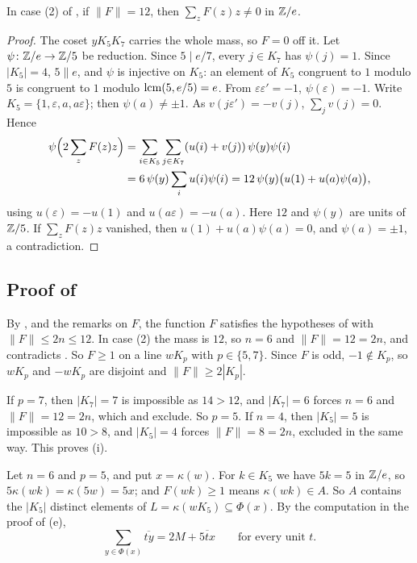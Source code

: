 \begin{lemma}\label{lem:killhalf}
In case \textup{(2)} of , if $\|F\|=12$, then
$\sum_{z}F(z)z\ne0$ in $\mathbb{Z}/e$.
\end{lemma}

\begin{proof}
The coset $yK_{5}K_{7}$ carries the whole mass, so $F=0$ off it. Let
$\psi\colon\mathbb{Z}/e\to\mathbb{Z}/5$ be reduction. Since $5\mid e/7$, every $j\in K_{7}$
has $\psi(j)=1$. Since $|K_{5}|=4$, $5\parallel e$, and $\psi$ is injective
on $K_{5}$: an element of $K_{5}$ congruent to $1$ modulo $5$ is congruent to
$1$ modulo $\operatorname{lcm}(5,e/5)=e$. From $\varepsilon\varepsilon'=-1$,
$\psi(\varepsilon)=-1$. Write $K_{5}=\{1,\varepsilon,a,a\varepsilon\}$; then
$\psi(a)\ne\pm1$. As $v(j\varepsilon')=-v(j)$, $\sum_{j}v(j)=0$. Hence
\begin{align*}
  \psi\Bigl(2\sum_{z}F(z)z\Bigr)&=\sum_{i\in K_{5}}\sum_{j\in K_{7}}
  (u(i)+v(j))\,\psi(y)\psi(i)\\
  &=6\,\psi(y)\sum_{i}u(i)\psi(i)=12\,\psi(y)\bigl(u(1)+u(a)\psi(a)\bigr),
\end{align*}
using $u(\varepsilon)=-u(1)$ and $u(a\varepsilon)=-u(a)$. Here $12$ and
$\psi(y)$ are units of $\mathbb{Z}/5$. If $\sum_{z}F(z)z$ vanished, then
$u(1)+u(a)\psi(a)=0$, and $\psi(a)=\pm1$, a contradiction.
\end{proof}

\subsection{Proof of \texorpdfstring{}{the theorem}}
By ,  and the remarks on $F$, the function
$F$ satisfies the hypotheses of  with $\|F\|\le2n\le12$. In
case (2) the mass is $12$, so $n=6$ and $\|F\|=12=2n$, and 
contradicts . So $F\ge1$ on a line $wK_{p}$ with
$p\in\{5,7\}$. Since $F$ is odd, $-1\notin K_{p}$, so $wK_{p}$ and
$-wK_{p}$ are disjoint and $\|F\|\ge2|K_{p}|$.

If $p=7$, then $|K_{7}|=7$ is impossible as $14>12$, and $|K_{7}|=6$ forces
$n=6$ and $\|F\|=12=2n$, which  and 
exclude. So $p=5$. If $n=4$, then $|K_{5}|=5$ is impossible as $10>8$, and
$|K_{5}|=4$ forces $\|F\|=8=2n$, excluded in the same way. This proves (i).

Let $n=6$ and $p=5$, and put $x=\kappa(w)$. For $k\in K_{5}$ we have $5k=5$
in $\mathbb{Z}/e$, so $5\kappa(wk)=\kappa(5w)=5x$; and $F(wk)\ge1$ means
$\kappa(wk)\in A$. So $A$ contains the $|K_{5}|$ distinct elements of
$L=\kappa(wK_{5})\subseteq\Phi(x)$. By the computation in the proof of
(e),
\[
  \sum_{y\in\Phi(x)}\overline{ty}=2M+\overline{5tx}\qquad\text{for every
  unit }t.
\]

